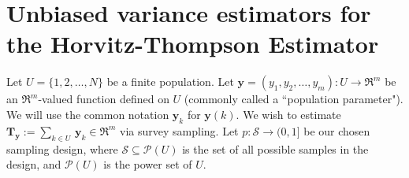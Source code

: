 \documentclass{article}
\begin{document}

\section{Unbiased variance estimators for the Horvitz-Thompson Estimator}
\setcounter{theorem}{0}

Let $U = \{1,2,\ldots,N\}$ be a finite population.
Let $\mathbf{y} = (y_{1},y_{2},\ldots,y_{m}) : U \longrightarrow \Re^{m}$ be an $\Re^{m}$-valued function defined on $U$
(commonly called a ``population parameter").
We will use the common notation $\mathbf{y}_{k}$ for $\mathbf{y}(k)$.
We wish to estimate
$\mathbf{T}_{\mathbf{y}} := \underset{k \in U}{\sum}\,\mathbf{y}_{k} \in \Re^{m}$
via survey sampling.
Let $p:\mathcal{S} \longrightarrow (0,1]$ be our chosen sampling design,
where $\mathcal{S} \subseteq \mathcal{P}(U)$ is the set of all possible
samples in the design, and $\mathcal{P}(U)$ is the power set of $U$.
\end{document}
